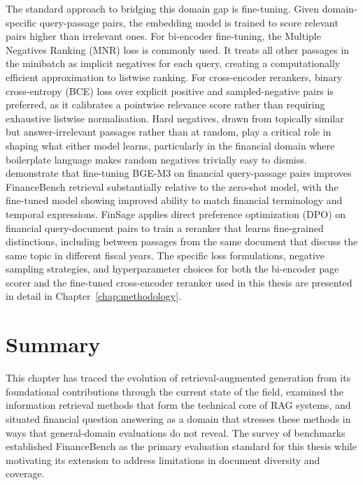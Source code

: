 \documentclass[12pt,twoside,maitrise]{dms}
\theoremstyle{definition}
\numberwithin{equation}{section}
\numberwithin{table}{chapter}
\numberwithin{figure}{chapter}
\begin{document}
The standard approach to bridging this domain gap is fine-tuning. Given
domain-specific query-passage pairs, the embedding model is trained to score relevant
pairs higher than irrelevant ones. For bi-encoder fine-tuning, the Multiple Negatives
Ranking (MNR) loss is commonly used. It treats all other passages in the
minibatch as implicit negatives for each query, creating a computationally efficient
approximation to listwise ranking. For cross-encoder rerankers, binary cross-entropy
(BCE) loss over explicit positive and sampled-negative pairs is preferred, as it
calibrates a pointwise relevance score rather than requiring exhaustive listwise
normalisation. Hard negatives, drawn from topically similar but answer-irrelevant
passages rather than at random, play a critical role in shaping what either model
learns, particularly in the financial domain where boilerplate language makes random
negatives trivially easy to dismiss. \citet{kim2024optimizing} demonstrate that fine-tuning BGE-M3 on financial query-passage
pairs improves FinanceBench retrieval substantially relative to the zero-shot model, with
the fine-tuned model showing improved ability to match financial terminology and temporal
expressions. FinSage \citep{wang2024finsage} applies direct preference optimization (DPO) on
financial query-document pairs to train a reranker that learns fine-grained distinctions,
including between passages from the same document that discuss the same topic in different
fiscal years. The specific loss formulations, negative sampling
strategies, and hyperparameter choices for both the bi-encoder page scorer and the
fine-tuned cross-encoder reranker used in this thesis are presented in detail in
Chapter~\ref{chap:methodology}.


\section{Summary}

This chapter has traced the evolution of retrieval-augmented generation from its
foundational contributions through the current state of the field, examined the
information retrieval methods that form the technical core of RAG systems, and situated
financial question answering as a domain that stresses these methods in ways that
general-domain evaluations do not reveal. The survey of benchmarks established
FinanceBench as the primary evaluation standard for this thesis while motivating its
extension to address limitations in document diversity and coverage.
\end{document}
